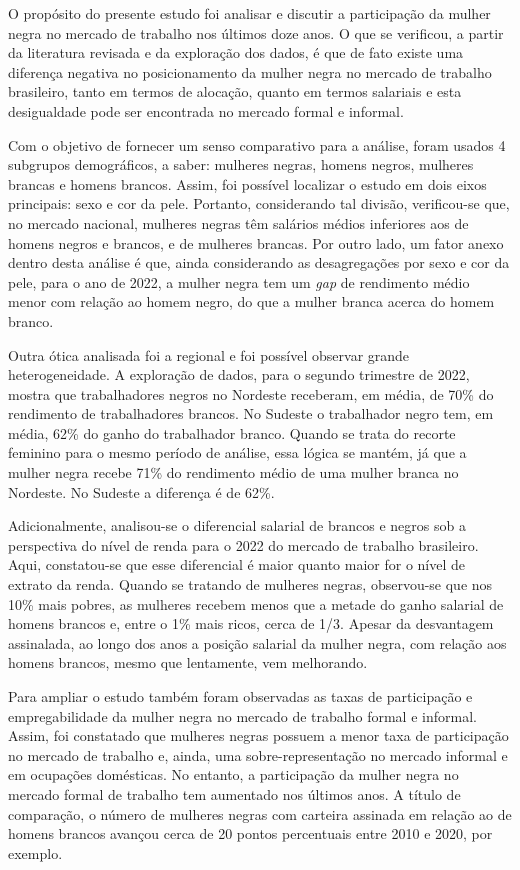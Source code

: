\documentclass[12pt]{article}
\begin{document}
\par O propósito do presente estudo foi analisar e discutir a participação da mulher negra no mercado de trabalho nos últimos doze anos. O que se verificou, a partir da literatura revisada e da exploração dos dados, é que de fato existe uma diferença negativa no posicionamento da mulher negra no mercado de trabalho brasileiro, tanto em termos de alocação, quanto em termos salariais e esta desigualdade pode ser encontrada no mercado formal e informal.
\par Com o objetivo de fornecer um senso comparativo para a análise, foram usados 4 subgrupos demográficos, a saber: mulheres negras, homens negros, mulheres brancas e homens brancos. Assim, foi possível localizar o estudo em dois eixos principais: sexo e cor da pele. Portanto, considerando tal divisão, verificou-se que, no mercado nacional, mulheres negras têm salários médios inferiores aos de homens negros e brancos, e de mulheres brancas. Por outro lado, um fator anexo dentro desta análise é que, ainda considerando as desagregações por sexo e cor da pele, para o ano de 2022, a mulher negra tem um \textit{gap} de rendimento médio menor com relação ao homem negro, do que a mulher branca acerca do homem branco. 
\par Outra ótica analisada foi a regional e foi possível observar grande heterogeneidade. A exploração de dados, para o segundo trimestre de 2022, mostra que trabalhadores negros no Nordeste receberam, em média, de 70\% do rendimento de trabalhadores brancos. No Sudeste o trabalhador negro tem, em média, 62\% do ganho do trabalhador branco. Quando se trata do recorte feminino para o mesmo período de análise, essa lógica se mantém, já que a mulher negra recebe 71\% do rendimento médio de uma mulher branca no Nordeste. No Sudeste a diferença é de 62\%.
\par Adicionalmente, analisou-se o diferencial salarial de brancos e negros sob a perspectiva do nível de renda para o 2022 do mercado de trabalho brasileiro. Aqui, constatou-se que esse diferencial é maior quanto maior for o nível de extrato da renda. Quando se tratando de mulheres negras, observou-se que nos 10\% mais pobres, as mulheres recebem menos que a metade do ganho salarial de homens brancos e, entre o 1\% mais ricos, cerca de 1/3. Apesar da desvantagem assinalada, ao longo dos anos a posição salarial da mulher negra, com relação aos homens brancos, mesmo que lentamente, vem melhorando.
\par Para ampliar o estudo também foram observadas as taxas de participação e empregabilidade da mulher negra no mercado de trabalho formal e informal. Assim, foi constatado que mulheres negras possuem a menor taxa de participação no mercado de trabalho e, ainda, uma sobre-representação no mercado informal e em ocupações domésticas. No entanto, a participação da mulher negra no mercado formal de trabalho tem aumentado nos últimos anos. A título de comparação, o número de mulheres negras com carteira assinada em relação ao de homens brancos avançou cerca de 20 pontos percentuais entre 2010 e 2020, por exemplo.
\end{document}
